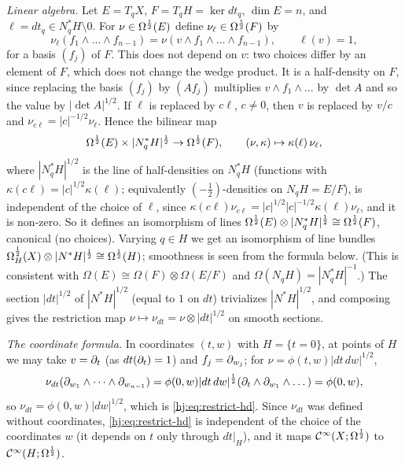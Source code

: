 \emph{Linear algebra.} Let $E=T_qX$, $F=T_qH=\ker dt_q$, $\dim E=n$, and $\ell=dt_q\in
N^*_qH\setminus0$. For $\nu\in\Omega^{\frac12}(E)$ define $\nu_\ell\in\Omega^{\frac12}(F)$ by
\begin{equation*}
\nu_\ell(f_1\wedge\dots\wedge f_{n-1})=\nu(v\wedge f_1\wedge\dots\wedge f_{n-1}),\qquad
\ell(v)=1,
\end{equation*}
for a basis $(f_j)$ of $F$. This does not depend on $v$: two choices differ by an element of
$F$, which does not change the wedge product. It is a half-density on $F$, since replacing
the basis $(f_j)$ by $(Af_j)$ multiplies $v\wedge f_1\wedge\dots$ by $\det A$ and so the
value by $|\det A|^{1/2}$. If $\ell$ is replaced by $c\ell$, $c\ne0$, then $v$ is replaced by
$v/c$ and $\nu_{c\ell}=|c|^{-1/2}\nu_\ell$. Hence the bilinear map
\begin{equation*}
\Omega^{\frac12}(E)\times|N^*_qH|^{\frac12}\to\Omega^{\frac12}(F),\qquad(\nu,\kappa)\mapsto
\kappa(\ell)\,\nu_\ell,
\end{equation*}
where $|N^*_qH|^{1/2}$ is the line of half-densities on $N^*_qH$ (functions with
$\kappa(c\ell)=|c|^{1/2}\kappa(\ell)$; equivalently $(-\frac12)$-densities on $N_qH=E/F$), is
independent of the choice of $\ell$, since $\kappa(c\ell)\nu_{c\ell}=|c|^{1/2}|c|^{-1/2}
\kappa(\ell)\nu_\ell$, and it is non-zero. So it defines an isomorphism of lines
$\Omega^{\frac12}(E)\otimes|N^*_qH|^{\frac12}\cong
\Omega^{\frac12}(F)$, canonical (no choices). Varying $q\in H$ we get an isomorphism of line bundles
$\Omega^{\frac12}_H(X)\otimes|N^*H|^{\frac12}\cong\Omega^{\frac12}(H)$; smoothness is seen from the formula
below. (This is consistent with $\Omega(E)\cong\Omega(F)\otimes\Omega(E/F)$ and
$\Omega(N_qH)=|N^*_qH|^{-1}$.) The section $|dt|^{1/2}$ of $|N^*H|^{1/2}$ (equal to $1$ on
$dt$) trivializes $|N^*H|^{1/2}$, and composing gives the restriction map $\nu\mapsto
\nu_{dt}=\nu\otimes|dt|^{1/2}$ on smooth sections.

\emph{The coordinate formula.} In coordinates $(t,w)$ with $H=\{t=0\}$, at points of $H$
we may take $v=\partial_t$ (as $dt(\partial_t)=1$) and $f_j=\partial_{w_j}$; for $\nu=\phi(t,w)|dt\,dw|^{1/2}$,
\begin{equation*}
\nu_{dt}(\partial_{w_1}\wedge\dots\wedge\partial_{w_{n-1}})=\phi(0,w)|dt\,dw|^{\frac12}(\partial_t\wedge
\partial_{w_1}\wedge\dots)=\phi(0,w),
\end{equation*}
so $\nu_{dt}=\phi(0,w)|dw|^{1/2}$, which is \eqref{hj:eq:restrict-hd}. Since $\nu_{dt}$ was
defined without coordinates, \eqref{hj:eq:restrict-hd} is independent of the choice of the
coordinates $w$ (it depends on $t$ only through $dt|_H$), and it maps $\mathcal{C}^\infty(X;\Omega^{\frac12})$ to
$\mathcal{C}^\infty(H;\Omega^{\frac12})$.

